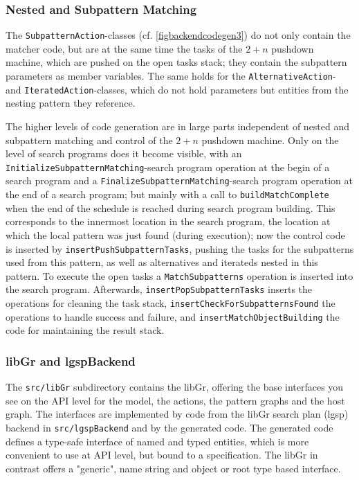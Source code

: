 \subsubsection*{Nested and Subpattern Matching}

The \texttt{Subpattern\-Action}-classes (cf. \ref{figbackendcodegen3}) do not only contain the matcher code, 
but are at the same time the tasks of the $2+n$ pushdown machine, which are pushed on the open tasks stack;
they contain the subpattern parameters as member variables.
The same holds for the \texttt{Alternative\-Action}- and \texttt{Iterated\-Action}-classes,
which do not hold parameters but entities from the nesting pattern they reference. 

The higher levels of code generation are in large parts independent of nested and subpattern matching and control of the $2+n$ pushdown machine.
Only on the level of search programs does it become visible,  
with an \texttt{Initialize\-Subpattern\-Matching}-search program operation at the begin of a search program
and a \texttt{Finalize\-Subpattern\-Matching}-search program operation at the end of a search program;
but mainly with a call to \texttt{build\-Match\-Complete} when the end of the schedule is reached during search program building.
This corresponds to the innermost location in the search program,
the location at which the local pattern was just found (during execution);
now the control code is inserted by \texttt{insert\-Push\-Subpattern\-Tasks},
pushing the tasks for the subpatterns used from this pattern, as well as alternatives and iterateds nested in this pattern.
To execute the open tasks a \texttt{Match\-Subpatterns} operation is inserted into the search program. 
Afterwards, \texttt{insert\-Pop\-Subpattern\-Tasks} inserts the operations for cleaning the task stack,
\texttt{insert\-Check\-For\-Subpatterns\-Found} the operations to handle success and failure, 
and \texttt{insert\-Match\-Object\-Building} the code for maintaining the result stack.


\subsubsection*{libGr and lgspBackend}

The \texttt{src/libGr} subdirectory contains the libGr, offering the base interfaces you see on the API level for the model, the actions, the pattern graphs and the host graph.
The interfaces are implemented by code from the libGr search plan (lgsp) backend in \texttt{src/lgspBackend} and by the generated code.
The generated code defines a type-safe interface of named and typed entities, which is more convenient to use at API level, but bound to a specification.
The libGr in contrast offers a "generic", name string and object or root type based interface.

